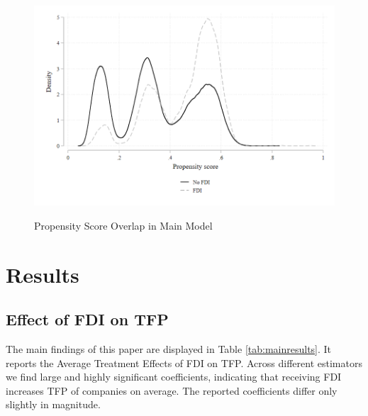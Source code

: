 \documentclass[a4paper,11pt]{scrartcl}
\begin{document}
\begin{figure}[h!]
	\centering
	\caption{Propensity Score Overlap in Main Model}
	\includegraphics[width=\textwidth]{graph}
  	\label{fig:graph}
\end{figure} 

\section{Results}

\subsection{Effect of FDI on TFP}
The main findings of this paper are displayed in Table \ref{tab:mainresults}. It reports the Average Treatment Effects of FDI on TFP. Across different estimators we find large and highly significant coefficients, indicating that receiving FDI increases TFP of companies on average. The reported coefficients differ only slightly in magnitude. 
\end{document}
